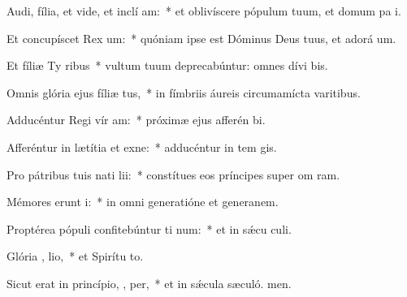 \item Audi, fília, et vide, et inclí  am:~* et oblivíscere pópulum tuum, et domum pa i.
\item Et concupíscet Rex  um:~* quóniam ipse est Dóminus Deus tuus, et adorá um.
\item Et fíliæ Ty  ribus~* vultum tuum deprecabúntur: omnes dívi bis.
\item Omnis glória ejus fíliæ   tus,~* in fímbriis áureis circumamícta varitibus.
\item Adducéntur Regi vír  am:~* próximæ ejus afferén bi.
\item Afferéntur in lætítia et exne:~* adducéntur in tem gis.
\item Pro pátribus tuis nati   lii:~* constítues eos príncipes super om ram.
\item Mémores erunt  i:~* in omni generatióne et generanem.
\item Proptérea pópuli confitebúntur ti  num:~* et in sǽcu culi.
\item Glória ,  lio,~* et Spirítu to.
\item Sicut erat in princípio,  ,  per,~* et in sǽcula sæculó. men.
